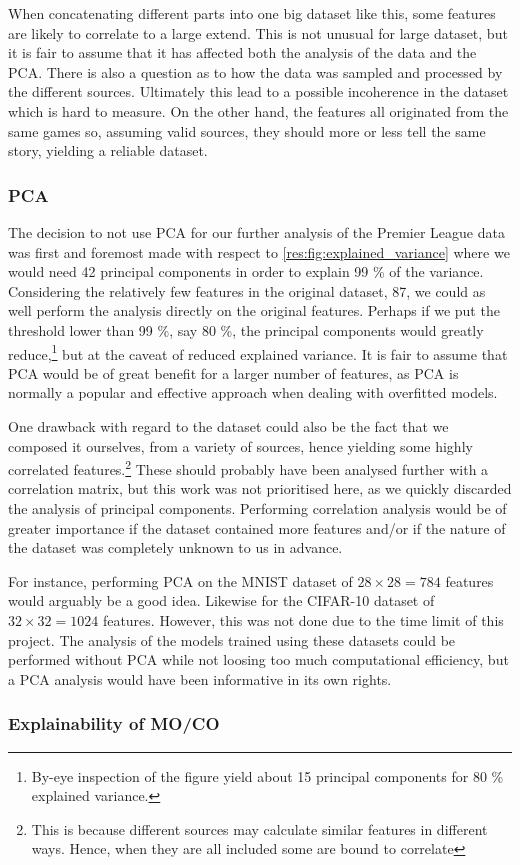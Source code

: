         When concatenating different parts into one big dataset like this, some features are likely to correlate to a large extend. This is not unusual for large dataset, but it is fair to assume that it has affected both the analysis of the data and the PCA. There is also a question as to how the data was sampled and processed by the different sources. Ultimately this lead to a possible incoherence in the dataset which is hard to measure. On the other hand, the features all originated from the same games so, assuming valid sources, they should more or less tell the same story, yielding a reliable dataset. 
    
\subsubsection{PCA}
    The decision to not use PCA for our further analysis of the Premier League data was first and foremost made with respect to \cref{res:fig:explained_variance} where we would need 42 principal components in order to explain 99 \% of the variance. Considering the relatively few features in the original dataset, 87, we could as well perform the analysis directly on the original features. Perhaps if we put the threshold lower than 99 \%, say 80 \%, the principal components would greatly reduce,\footnote{By-eye inspection of the  figure yield about 15 principal components for 80 \% explained variance.} but at the caveat of reduced explained variance. It is fair to assume that PCA would be of great benefit for a larger number of features, as PCA is normally a popular and effective approach when dealing with overfitted models.

    One drawback with regard to the dataset could also be the fact that we composed it ourselves, from a variety of sources, hence yielding some highly correlated features.\footnote{This is because different sources may calculate similar features in different ways. Hence, when they are all included some are bound to correlate} These should probably have been analysed further with a correlation matrix, but this work was not prioritised here, as we quickly discarded the analysis of principal components. Performing correlation analysis would be of greater importance if the dataset contained more features and/or if the nature of the dataset was completely unknown to us in advance. 

    For instance, performing PCA on the MNIST dataset of $28\times 28 = 784$ features would arguably be a good idea. Likewise for the CIFAR-10 dataset of $32\times 32 = 1024$ features. However, this was not done due to the time limit of this project. The analysis of the models trained using these datasets could be performed without PCA while not loosing too much computational efficiency, but a PCA analysis would have been informative in its own rights. 


    

\subsubsection{Explainability of MO/CO}


